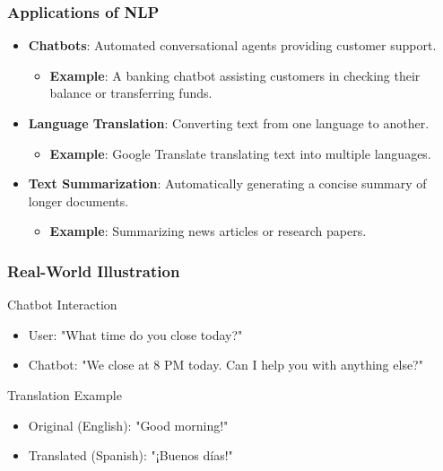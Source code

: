 \documentclass[aspectratio=169]{beamer}
\begin{document}
\begin{frame}
    \frametitle{Applications of NLP}
    \begin{itemize}
        \item \textbf{Chatbots}: Automated conversational agents providing customer support.
        \begin{itemize}
            \item \textbf{Example}: A banking chatbot assisting customers in checking their balance or transferring funds.
        \end{itemize}
        
        \item \textbf{Language Translation}: Converting text from one language to another.
        \begin{itemize}
            \item \textbf{Example}: Google Translate translating text into multiple languages.
        \end{itemize}
        
        \item \textbf{Text Summarization}: Automatically generating a concise summary of longer documents.
        \begin{itemize}
            \item \textbf{Example}: Summarizing news articles or research papers.
        \end{itemize}
    \end{itemize}
\end{frame}

\begin{frame}
    \frametitle{Real-World Illustration}
    \begin{block}{Chatbot Interaction}
        \begin{itemize}
            \item User: "What time do you close today?"
            \item Chatbot: "We close at 8 PM today. Can I help you with anything else?"
        \end{itemize}
    \end{block}
    
    \begin{block}{Translation Example}
        \begin{itemize}
            \item Original (English): "Good morning!"
            \item Translated (Spanish): "¡Buenos días!"
        \end{itemize}
    \end{block}
\end{frame}
\end{document}
